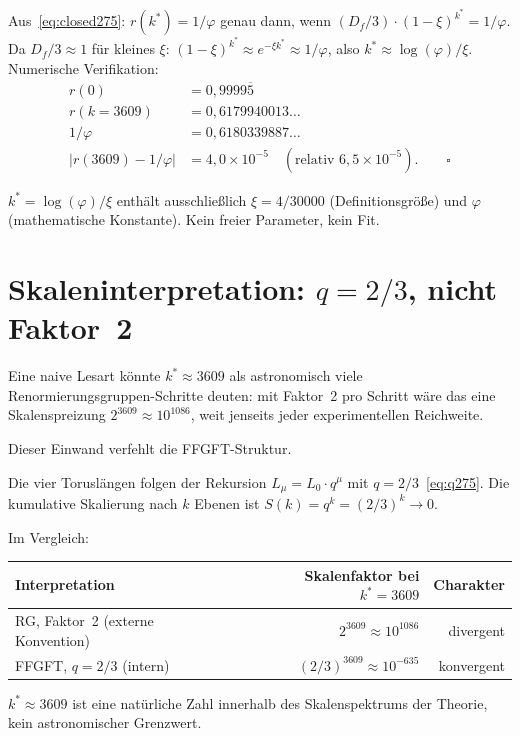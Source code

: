 \begin{beweis}
Aus~\eqref{eq:closed275}: $r(k^*) = 1/\varphi$ genau dann, wenn
$(D_f/3)\cdot(1-\xi)^{k^*} = 1/\varphi$.
Da $D_f/3 \approx 1$ für kleines $\xi$:
$(1-\xi)^{k^*} \approx e^{-\xi k^*} \approx 1/\varphi$,
also $k^* \approx \log(\varphi)/\xi$.
Numerische Verifikation:
\begin{align*}
  r(0)   &= 0{,}9999\overline{5} \\
  r(k{=}3609) &= 0{,}6179940013\ldots \\
  1/\varphi &= 0{,}6180339887\ldots \\
  |r(3609)-1/\varphi| &= 4{,}0\times10^{-5}
  \quad(\text{relativ } 6{,}5\times10^{-5}). \qquad\square
\end{align*}
\end{beweis}

\begin{remark}[Parameterfreiheit]
$k^* = \log(\varphi)/\xi$ enthält ausschließlich $\xi = 4/30000$
(Definitionsgröße) und $\varphi$ (mathematische Konstante).
Kein freier Parameter, kein Fit.
\end{remark}

\section{Skaleninterpretation: $q=2/3$, nicht Faktor~2}

\begin{remark}\label{bem:skala275}
Eine naive Lesart könnte $k^* \approx 3609$ als astronomisch viele
Renormierungsgruppen-Schritte deuten: mit Faktor~2 pro Schritt wäre das eine
Skalenspreizung $2^{3609} \approx 10^{1086}$, weit jenseits jeder
experimentellen Reichweite.

Dieser Einwand verfehlt die FFGFT-Struktur.
\end{remark}

Die vier Toruslängen folgen der Rekursion $L_\mu = L_0\cdot q^\mu$
mit $q = 2/3$~\eqref{eq:q275}. Die kumulative Skalierung nach $k$ Ebenen ist
$S(k) = q^k = (2/3)^k \to 0$.

\begin{proposition}\label{prop:konv275}
Im Vergleich:
\begin{center}
\begin{tabular}{@{}lrr@{}}
\toprule
Interpretation & Skalenfaktor bei $k^*=3609$ & Charakter \\
\midrule
RG, Faktor~2 (externe Konvention) & $2^{3609}\approx 10^{1086}$ & divergent \\
FFGFT, $q=2/3$ (intern)           & $(2/3)^{3609}\approx 10^{-635}$ & konvergent \\
\bottomrule
\end{tabular}
\end{center}
$k^* \approx 3609$ ist eine natürliche Zahl innerhalb des Skalenspektrums
der Theorie, kein astronomischer Grenzwert.
\end{proposition}

